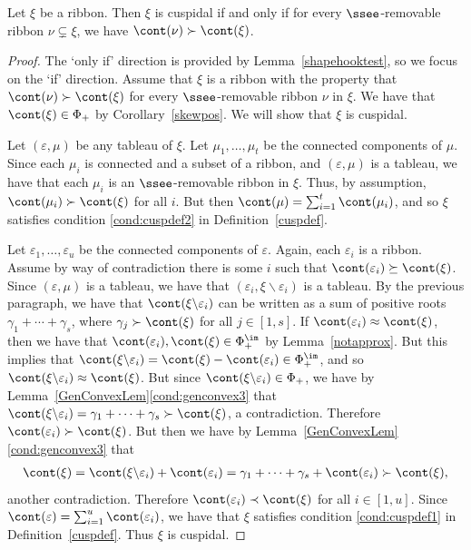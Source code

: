  \begin{lemma}\label{CuspForSkewHook}
Let \(\xi\) be a ribbon. Then \(\xi\) is cuspidal if and only if for every \(\ssee\)-removable ribbon \(\nu \subsetneq \xi\), we have \(\cont(\nu) \succ \cont(\xi)\).
 \end{lemma}
 \begin{proof}
The `only if' direction is provided by Lemma~\ref{shapehooktest}, so we focus on the `if' direction. 
 Assume that \(\xi\) is a ribbon with
 the property that \(\cont(\nu) \succ \cont(\xi)\) for every \(\ssee\)-removable ribbon \(\nu\) in \( \xi\). We have that \(\cont(\xi) \in \Phi_+\) by Corollary~\ref{skewpos}. We will show that \(\xi\) is cuspidal. 
 
 
 Let \((\varepsilon, \mu)\) be any tableau of \(\xi\). Let \(\mu_1, \ldots, \mu_t\) be the connected components of \(\mu\). Since each \(\mu_i\) is connected and a subset of a ribbon, and \((\varepsilon, \mu)\) is a tableau, we have that each \(\mu_i\) is an \(\ssee\)-removable ribbon in \(\xi\). Thus, by assumption, \(\cont(\mu_i) \succ \cont(\xi)\) for all \(i\). But then \(\cont(\mu) = \sum_{i=1}^t \cont(\mu_i)\), and so \(\xi\) satisfies condition \eqref{cond:cuspdef2} in Definition~\ref{cuspdef}.
 
 Let \(\varepsilon_1, \ldots, \varepsilon_u\) be the connected components of \(\varepsilon\). Again, each \(\varepsilon_i\) is a ribbon. Assume by way of contradiction there is some \(i\) such that \(\cont(\varepsilon_i) \succeq \cont(\xi)\). Since \((\varepsilon, \mu)\) is a tableau, we have that \((\varepsilon_i, \xi\backslash \varepsilon_i)\) is a tableau. By the previous paragraph, we have that \(\cont(\xi \backslash \varepsilon_i)\) can be written as a sum of positive roots \(\gamma_1 + \cdots + \gamma_s\), where \(\gamma_j \succ \cont(\xi)\) for all \(j \in [1,s]\). 
 If \(\cont(\varepsilon_i) \approx \cont(\xi)\), then we have that \(\cont(\varepsilon_i),\cont(\xi) \in \Phi_+^\im\) by Lemma~\ref{notapprox}. But this implies that \(\cont(\xi \backslash \varepsilon_i) = \cont(\xi) - \cont(\varepsilon_i) \in \Phi_+^\im\), and so \(\cont(\xi\backslash \varepsilon_i) \approx \cont(\xi)\). But since \(\cont(\xi \backslash \varepsilon_i) \in \Phi_+\), we have by Lemma~\ref{GenConvexLem}\eqref{cond:genconvex3} that \(\cont(\xi \backslash \varepsilon_i) =  \gamma_1 + \cdots + \gamma_s \succ \cont(\xi)\), a contradiction. Therefore \(\cont(\varepsilon_i) \succ \cont(\xi)\). But then we have by Lemma~\ref{GenConvexLem}\eqref{cond:genconvex3} that 
 \begin{align*}
 \cont(\xi) = \cont(\xi \backslash \varepsilon_i) + \cont(\varepsilon_i) = \gamma_1 + \cdots + \gamma_s + \cont(\varepsilon_i) \succ \cont(\xi),
 \end{align*}
 another contradiction. Therefore \(\cont(\varepsilon_i) \prec \cont(\xi)\) for all \(i \in [1,u]\). Since \(\cont(\varepsilon) = \sum_{i=1}^u \cont(\varepsilon_i)\), we have that \(\xi\) satisfies condition \eqref{cond:cuspdef1} in Definition~\ref{cuspdef}. Thus \(\xi\) is cuspidal.
 \end{proof}


